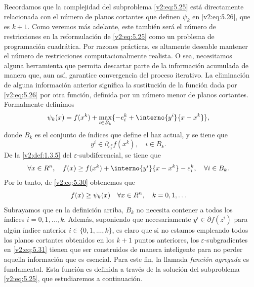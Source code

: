 Recordamos que la complejidad del subproblema \eqref{v2:eq:5.25} está directamente relacionada con el número de planos cortantes que definen $\psi_k$ en \eqref{v2:eq:5.26}, que es $k+1$. Como veremos más adelante, este también será el número de restricciones en la reformulación de \eqref{v2:eq:5.25} como un problema de programación cuadrática. Por razones prácticas, es altamente deseable mantener el número de restricciones computacionalmente realista. O sea, necesitamos alguna herramienta que permita descartar parte de la información acumulada de manera que, aun así, garantice convergencia del proceso iterativo. La eliminación de alguna información anterior significa la sustitución de la función dada por \eqref{v2:eq:5.26} por otra función, definida por un número menor de planos cortantes. Formalmente definimos
\begin{equation}
    \psi_k(x) = f(x^k) + \max_{i \in B_k} \{ -e_i^k + \interno{y^i}{x - x^k} \},
    \label{v2:eq:5.30}
\end{equation}
donde $B_k$ es el conjunto de índices que define el haz actual, y se tiene que
\begin{equation}
    y^i \in \partial_{e_i^k} f(x^k), \quad i \in B_k.
    \label{v2:eq:5.31}
\end{equation}
De la \cref{v2:def:1.3.5} del $\varepsilon$-subdiferencial, se tiene que
\[
    \forall x \in \Rn, \quad f(x) \ge f(x^k) + \interno{y^i}{x - x^k} - e_i^k, \quad \forall i \in B_k.
\]
Por lo tanto, de \eqref{v2:eq:5.30} obtenemos que
\begin{equation}
    f(x) \ge \psi_k(x) \quad \forall x \in \Rn, \quad k = 0, 1, \dots
    \label{v2:eq:5.32}
\end{equation}
Subrayamos que en la definición arriba, $B_k$ no necesita contener a todos los índices $i = 0, 1, \dots, k$. Además, suponiendo que necesariamente $y^i \in \partial f(z^i)$ para algún índice anterior $i \in \{0, 1, \dots, k\}$, es claro que si no estamos empleando todos los planos cortantes obtenidos en los $k+1$ puntos anteriores, los $\varepsilon$-subgradientes en \eqref{v2:eq:5.31} tienen que ser construidos de manera inteligente para no perder aquella información que es esencial. Para este fin, la llamada \textit{función agregada} es fundamental. Esta función es definida a través de la solución del subproblema \eqref{v2:eq:5.25}, que estudiaremos a continuación.

